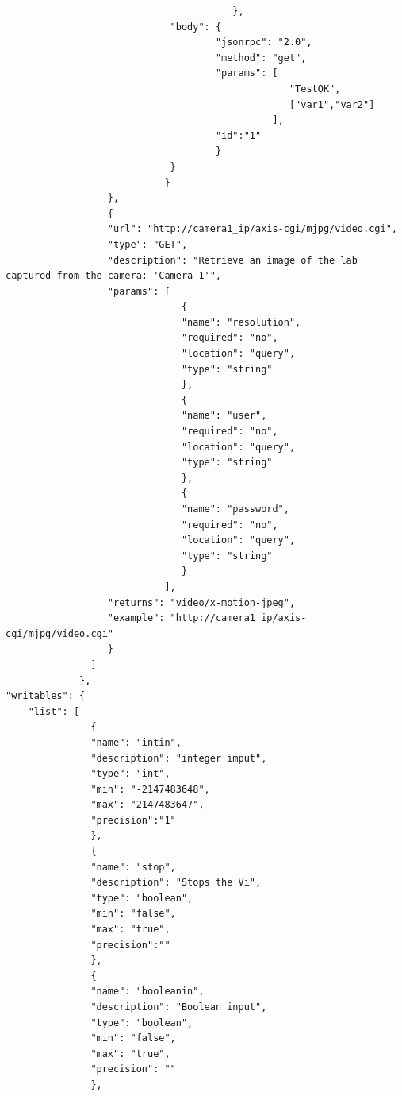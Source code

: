 \begin{lstlisting}
                                        },
                             "body": {
                                     "jsonrpc": "2.0",
                                     "method": "get",
                                     "params": [
                                                  "TestOK",
                                                  ["var1","var2"]
                                               ],
                                     "id":"1"
                                     }
                             }
                            }
                  },
                  {
                  "url": "http://camera1_ip/axis-cgi/mjpg/video.cgi",
                  "type": "GET",
                  "description": "Retrieve an image of the lab captured from the camera: 'Camera 1'",
                  "params": [
                               {
                               "name": "resolution",
                               "required": "no",
                               "location": "query",
                               "type": "string"
                               },
                               {
                               "name": "user",
                               "required": "no",
                               "location": "query",
                               "type": "string"
                               },
                               {
                               "name": "password",
                               "required": "no",
                               "location": "query",
                               "type": "string"
                               }
                            ],
                  "returns": "video/x-motion-jpeg",
                  "example": "http://camera1_ip/axis-cgi/mjpg/video.cgi"
                  }
               ]
             },
"writables": {
    "list": [
               {
               "name": "intin",
               "description": "integer imput",
               "type": "int",
               "min": "-2147483648",
               "max": "2147483647",
               "precision":"1"
               },
               {
               "name": "stop",
               "description": "Stops the Vi",
               "type": "boolean",
               "min": "false",
               "max": "true",
               "precision":""
               },
               {
               "name": "booleanin",
               "description": "Boolean input",
               "type": "boolean",
               "min": "false",
               "max": "true",
               "precision": ""
               },

\end{lstlisting}
